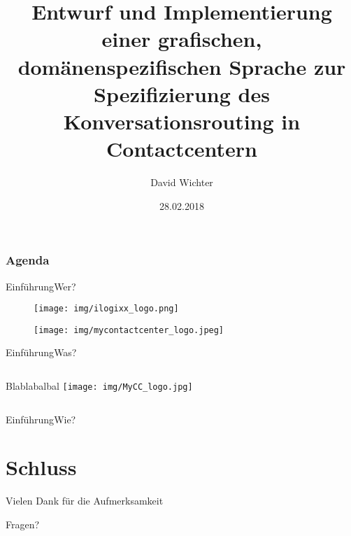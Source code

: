 \documentclass[t,aspectratio=169,divpsnames]{beamer}
\title[Entwurf und Implementierung einer DSL zur Spezifikation von Konversationsrouting]{Entwurf und Implementierung einer grafischen, domänenspezifischen Sprache zur Spezifizierung des Konversationsrouting in Contactcentern}
\author{David Wichter}
\institute{Hochschule Trier}
\date{28.02.2018}
\begin{document}
\begin{frame}
\titlepage
\end{frame}

\begin{frame}
	\frametitle{Agenda}
	\tableofcontents
\end{frame}

\begin{frame}{Einführung}{Wer?}
	\only<1->
		{
			\begin{figure}
				\texttt{[image: img/ilogixx\_logo.png]}
			\end{figure}
		}
		{
			\begin{figure}
				\texttt{[image: img/mycontactcenter\_logo.jpeg]}
			\end{figure}
		}
\end{frame}

\begin{frame}{Einführung}{Was?}
	\begin{columns}
			Blablabalbal
			\texttt{[image: img/MyCC\_logo.jpg]}
	\end{columns}
\end{frame}

\begin{frame}{Einführung}{Wie?}

\end{frame}

\section*{Schluss}
\begin{frame}
	\begin{center}
		\huge{Vielen Dank für die Aufmerksamkeit}
	\end{center}
	\begin{center}
		\Huge{Fragen?}
	\end{center}
\end{frame}

\begin{frame}[allowframebreaks]{\bibname}
\end{frame}
\end{document}
